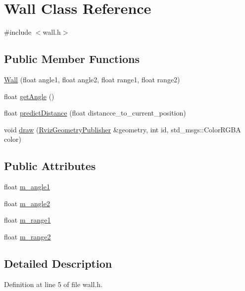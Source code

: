 \hypertarget{class_wall}{}\section{Wall Class Reference}
\label{class_wall}


{\ttfamily \#include $<$wall.\+h$>$}

\subsection*{Public Member Functions}
\begin{DoxyCompactItemize}
\item 
\hyperlink{class_wall_a033589df14e33d23252eea91b2cc998e}{Wall} (float angle1, float angle2, float range1, float range2)
\item 
float \hyperlink{class_wall_abf364c04876e2a2fe2afa609f87397ec}{get\+Angle} ()
\item 
float \hyperlink{class_wall_ad5b01236dea4aed8c75a8600c2b64c02}{predict\+Distance} (float distancce\+\_\+to\+\_\+current\+\_\+position)
\item 
void \hyperlink{class_wall_a18659ecc23d4b23617072afdd95c9d68}{draw} (\hyperlink{class_rviz_geometry_publisher}{Rviz\+Geometry\+Publisher} \&geometry, int id, std\+\_\+msgs\+::\+Color\+R\+G\+BA color)
\end{DoxyCompactItemize}
\subsection*{Public Attributes}
\begin{DoxyCompactItemize}
\item 
float \hyperlink{class_wall_aa55464f62abb57889a95936563a20671}{m\+\_\+angle1}
\item 
float \hyperlink{class_wall_a1acb9bc37500a68c08db14c3659c3cd0}{m\+\_\+angle2}
\item 
float \hyperlink{class_wall_a56b11c6748405e939de7cf4f9fabdc2d}{m\+\_\+range1}
\item 
float \hyperlink{class_wall_aeb7c600e6e41792c60498ca310c833f1}{m\+\_\+range2}
\end{DoxyCompactItemize}


\subsection{Detailed Description}


Definition at line 5 of file wall.\+h.



